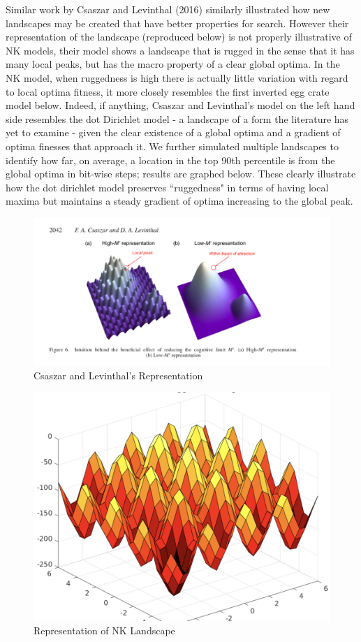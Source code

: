 \documentclass[11pt, oneside]{article}   	%
\begin{document}
Similar work by Csaszar and Levinthal (2016) similarly illustrated how new landscapes may be created that have better properties for search. However their representation of the landscape (reproduced below) is not properly illustrative of NK models, their model shows a landscape that is rugged in the sense that it has many local peaks, but has the macro property of a clear global optima. In the NK model, when ruggedness is high there is actually little variation with regard to local optima fitness, it more closely resembles the first inverted egg crate model below. Indeed, if anything, Csaszar and Levinthal's model on the left hand side resembles the dot Dirichlet model - a landscape of a form the literature has yet to examine - given the clear existence of a global optima and a gradient of optima finesses that approach it. We further simulated multiple landscapes to identify how far, on average, a location in the top 90th percentile is from the global optima in bit-wise steps; results are graphed below. These clearly illustrate how the dot dirichlet model preserves ``ruggedness" in terms of having local maxima but maintains a steady gradient of optima increasing to the global peak. 


\begin{figure}[h!]
  \caption{Csaszar and Levinthal's Representation}
  \includegraphics[width=1\textwidth]{Csaszar_Figure.png}
\end{figure}

\begin{figure}[h!]
  \caption{Representation of NK Landscape}
  \includegraphics[width=.7\textwidth]{Egg_Crate_Rough.png}
\end{figure}
\end{document}
